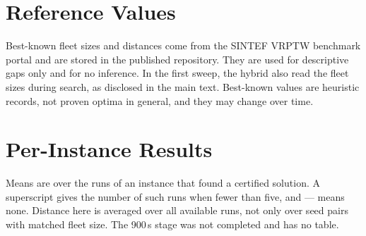 \documentclass{article}
\begin{document}
\section{Reference Values}
\label{sec:supp_reference_values}

Best-known fleet sizes and distances come from the SINTEF VRPTW benchmark portal and are stored in the published repository. They are used for descriptive gaps only and for no inference. In the first sweep, the hybrid also read the fleet sizes during search, as disclosed in the main text. Best-known values are heuristic records, not proven optima in general, and they may change over time.

\section{Per-Instance Results}
\label{sec:supp_per_instance}

{\footnotesize Means are over the runs of an instance that found a certified solution. A superscript gives the number of such runs when fewer than five, and --- means none. Distance here is averaged over all available runs, not only over seed pairs with matched fleet size. The 900\,s stage was not completed and has no table.\par}
\end{document}
